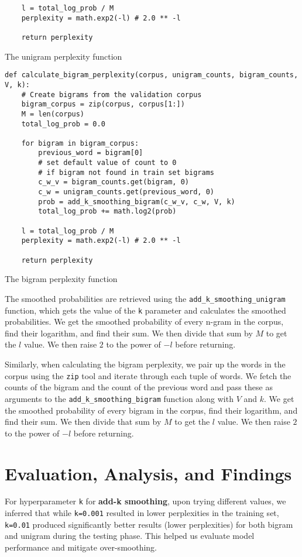 \documentclass[a4paper]{article}
\begin{document}
{\begin{listing}[!htbp]
\begin{verbatim}
    l = total_log_prob / M
    perplexity = math.exp2(-l) # 2.0 ** -l

    return perplexity
\end{verbatim}
\caption{The unigram perplexity function}
\label{lst:unigram_perplexity}
\end{listing}

\begin{listing}[!htbp]
\begin{verbatim}
def calculate_bigram_perplexity(corpus, unigram_counts, bigram_counts, V, k):
    # Create bigrams from the validation corpus
    bigram_corpus = zip(corpus, corpus[1:])
    M = len(corpus)
    total_log_prob = 0.0

    for bigram in bigram_corpus:
        previous_word = bigram[0]
        # set default value of count to 0 
        # if bigram not found in train set bigrams
        c_w_v = bigram_counts.get(bigram, 0) 
        c_w = unigram_counts.get(previous_word, 0)
        prob = add_k_smoothing_bigram(c_w_v, c_w, V, k)
        total_log_prob += math.log2(prob)

    l = total_log_prob / M
    perplexity = math.exp2(-l) # 2.0 ** -l

    return perplexity
\end{verbatim}
\caption{The bigram perplexity function}
\label{lst:bigram_perplexity}
\end{listing}

The smoothed probabilities are retrieved using the \texttt{add\_k\_smoothing\_unigram} function, which gets the value of the \texttt{k} parameter and calculates the smoothed probabilities. We get the smoothed probability of every n-gram in the corpus, find their logarithm, and find their sum. We then divide that sum by $M$ to get the $l$ value. We then raise $2$ to the power of $-l$ before returning.

Similarly, when calculating the bigram perplexity, we pair up the words in the corpus using the \texttt{zip} tool and iterate through each tuple of words. We fetch the counts of the bigram and the count of the previous word and pass these as arguments to the \texttt{add\_k\_smoothing\_bigram} function along with $V$ and $k$. We get the smoothed probability of every bigram in the corpus, find their logarithm, and find their sum. We then divide that sum by $M$ to get the $l$ value. We then raise $2$ to the power of $-l$ before returning.

\FloatBarrier

\section{Evaluation, Analysis, and Findings}
For hyperparameter \texttt{k} for \textbf{add-k smoothing}, upon trying different values, we inferred that while \texttt{k=0.001} resulted in lower perplexities in the training set, \texttt{k=0.01} produced significantly better results (lower perplexities) for both bigram and unigram during the testing phase. This helped us evaluate model performance and mitigate over-smoothing.\\
 
}
\end{document}

